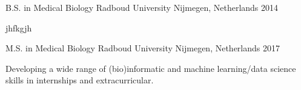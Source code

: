 

\begin{cventries}

  \cventry
    {B.S. in Medical Biology} %
    {Radboud University} %
    {Nijmegen, Netherlands} %
    {2014} %
    {
      \begin{cvitems} %
        \item {jhfkgjh}
      \end{cvitems}
    }

  \cventry
    {M.S. in Medical Biology} %
    {Radboud University} %
    {Nijmegen, Netherlands} %
    {2017} %
    {
      \begin{cvitems} %
        \item {Developing a wide range of (bio)informatic and machine learning/data science skills in internships and extracurricular.}
      \end{cvitems}
    }


\end{cventries}